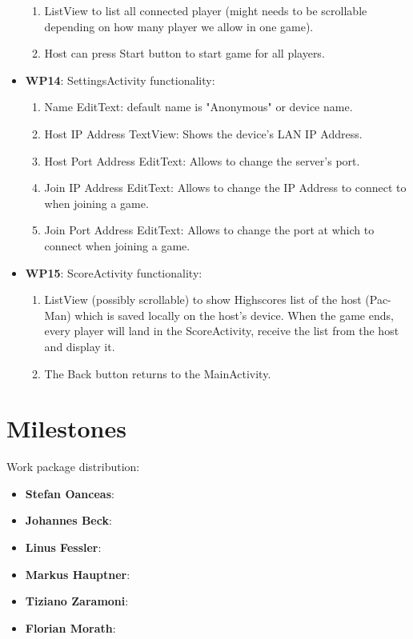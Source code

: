 \documentclass{report}
\begin{document}
\begin{itemize}
		\begin{enumerate}
			\item ListView to list all connected player (might needs to be scrollable depending on how many player we allow in one game).
			\item Host can press Start button to start game for all players.
		\end{enumerate}
	\item {\bf WP14}: SettingsActivity functionality:
		\begin{enumerate}
			\item Name EditText: default name is "Anonymous" or device name.
			\item Host IP Address TextView: Shows the device's LAN IP Address.
			\item Host Port Address EditText: Allows to change the server's port.
			\item Join IP Address EditText: Allows to change the IP Address to connect to when joining a game.
			\item Join Port Address EditText: Allows to change the port at which to connect when joining a game.
		\end{enumerate}
	\item {\bf WP15}: ScoreActivity functionality:
		\begin{enumerate}
			\item ListView (possibly scrollable) to show Highscores list of the host (Pac-Man) which is saved locally on the host's device. When the game ends, every player will land in the ScoreActivity, receive the list from the host and display it.
			\item The Back button returns to the MainActivity.
		\end{enumerate}
\end{itemize}

\section{Milestones}


Work package distribution: 
\begin{itemize}
        \item {\bf Stefan Oanceas}:
		\item {\bf Johannes Beck}:
		\item {\bf Linus Fessler}:
		\item {\bf Markus Hauptner}:
		\item {\bf Tiziano Zaramoni}:
		\item {\bf Florian Morath}:
\end{itemize}
\end{document}
